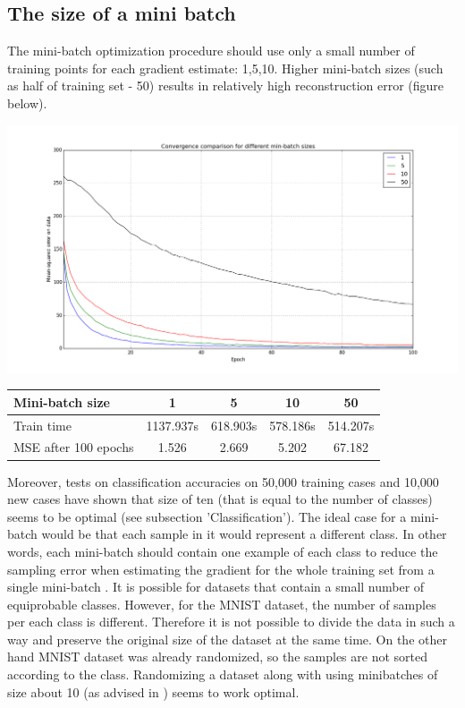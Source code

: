 \documentclass[a4paper]{scrartcl}
\begin{document}
\subsection{The size of a mini batch}
The mini-batch optimization procedure should use only a small number of training points for each gradient estimate: 1,5,10. Higher mini-batch sizes (such as half of training set - 50) results in relatively high reconstruction error (figure below). 
\begin{center}
\includegraphics[width=14cm]{images/batch.png}
\end{center}
\hspace{1cm}
\begin{tabular}{|l||c|c|c|c|} \hline
Mini-batch size & 1 & 5 & 10 & 50
\\ \hline
Train time & 1137.937s & 618.903s & 578.186s & 514.207s
\\ \hline
MSE after 100 epochs & 1.526 & 2.669 & 5.202 & 67.182
\\ \hline \end{tabular}
\vspace{1cm}
Moreover, tests on classification accuracies on 50,000 training cases and 10,000 new cases have shown that size of ten (that is equal to the number of classes) seems to be optimal (see subsection 'Classification'). The ideal case for a mini-batch would be that each sample in it would represent a different class. In other words, each mini-batch should contain one example of each class to reduce the sampling error when estimating the gradient for the whole training set from a single mini-batch \cite{Hinton}. It is possible for datasets that contain a small number of equiprobable classes. However, for the MNIST dataset, the number of samples per each class is different. Therefore it is not possible to divide the data in such a way and preserve the original size of the dataset at the same time. On the other hand MNIST dataset was already randomized, so the samples are not sorted according to the class. Randomizing a dataset along with using minibatches of size about 10 (as advised in \cite{Hinton}) seems to work optimal.
\end{document}
